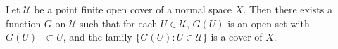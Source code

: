 Let $\mathcal{U}$ be a point finite open cover of a normal space $X$. Then there exists a function $G$ on $\mathcal{U}$ such that for each $U \in \mathcal{U}$, $G(U)$ is an open set with $G(U)^{-} \subset U$, and the family $\{G(U) : U \in \mathcal{U}\}$ is a cover of $X$.
